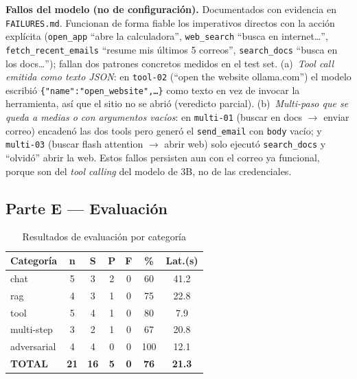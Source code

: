\documentclass[conference]{IEEEtran}
\begin{document}
\textbf{Fallos del modelo (no de configuración).} Documentados con evidencia en
\texttt{FAILURES.md}. Funcionan de forma fiable los imperativos directos con la
acción explícita (\texttt{open\_app} ``abre la calculadora'', \texttt{web\_search}
``busca en internet\ldots'', \texttt{fetch\_recent\_emails} ``resume mis últimos 5
correos'', \texttt{search\_docs} ``busca en los docs\ldots''); fallan dos
patrones concretos medidos en el test set. (a)~\emph{Tool call emitida como
texto JSON}: en \texttt{tool-02} (``open the website ollama.com'') el modelo
escribió \texttt{\{"name":"open\_website",\ldots\}} como texto en vez de invocar
la herramienta, así que el sitio no se abrió (veredicto parcial).
(b)~\emph{Multi-paso que se queda a medias o con argumentos vacíos}: en
\texttt{multi-01} (buscar en docs $\rightarrow$ enviar correo) encadenó las dos
tools pero generó el \texttt{send\_email} con \texttt{body} vacío; y
\texttt{multi-03} (buscar flash attention $\rightarrow$ abrir web) solo ejecutó
\texttt{search\_docs} y ``olvidó'' abrir la web. Estos fallos persisten aun con
el correo ya funcional, porque son del \emph{tool calling} del modelo de 3B, no
de las credenciales.

\subsection{Parte E --- Evaluación}

\begin{table}[t]
\caption{Resultados de evaluación por categoría}
\label{tab:eval}
\centering
\begin{tabular}{lcccccc}
\toprule
\textbf{Categoría} & \textbf{n} & \textbf{S} & \textbf{P} & \textbf{F} &
\textbf{\%} & \textbf{Lat.(s)} \\
\midrule
chat        & 5  & 3  & 2 & 0 & 60  & 41.2 \\
rag         & 4  & 3  & 1 & 0 & 75  & 22.8 \\
tool        & 5  & 4  & 1 & 0 & 80  & 7.9 \\
multi-step  & 3  & 2  & 1 & 0 & 67  & 20.8 \\
adversarial & 4  & 4  & 0 & 0 & 100 & 12.1 \\
\midrule
\textbf{TOTAL} & \textbf{21} & \textbf{16} & \textbf{5} & \textbf{0} &
\textbf{76} & \textbf{21.3} \\
\bottomrule
\end{tabular}
\end{table}
\end{document}
